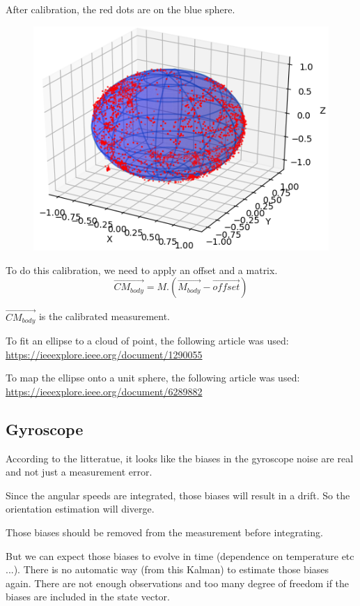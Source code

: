 \documentclass[titlepage,a4,12pt]{article}
\numberwithin{equation}{subsection}
\begin{document}
After calibration, the red dots are on the blue sphere.

\begin{figure}[H]
\includegraphics{calibratedmag.png}
\end{figure}

To do this calibration, we need to apply an offset and a matrix.
\begin{equation}
\overrightarrow{CM_{body}} = M.  (\overrightarrow{M_{body}} - \overrightarrow{offset})
\end{equation}

$\overrightarrow{CM_{body}}$ is the calibrated measurement.


To fit an ellipse to a cloud of point, the following article was used:
\url{https://ieeexplore.ieee.org/document/1290055}

To map the ellipse onto a unit sphere, the following article was used:
\url{https://ieeexplore.ieee.org/document/6289882}

\subsection{Gyroscope}

According to the litteratue, it looks like the biases in the gyroscope noise are real and not just a measurement error.

Since the angular speeds are integrated, those biases will result in a drift.
So the orientation estimation will diverge.

Those biases should be removed from the measurement before integrating.

But we can expect those biases to evolve in time (dependence on temperature etc ...). There is no automatic way (from this Kalman) to estimate those biases again. There are not enough observations and too many degree of freedom if the biases are included in the state vector.
\end{document}
